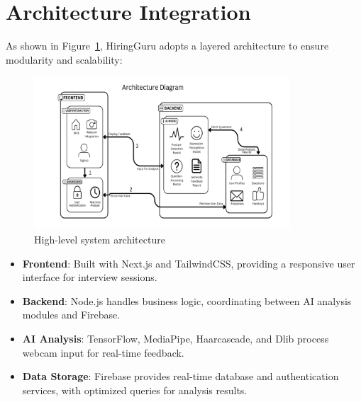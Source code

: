 \section{Architecture Integration}
As shown in Figure~\ref{fig:architecture}, HiringGuru adopts a layered architecture to ensure modularity and scalability:

\begin{figure}[h]
  \centering
  \includegraphics[width=0.85\textwidth]{sections/diagrams/ArchitectureDiagram.png}
  \caption{High-level system architecture}
  \label{fig:architecture}
\end{figure}

\begin{itemize}
    \item \textbf{Frontend}: Built with Next.js and TailwindCSS, providing a responsive user interface for interview sessions.
    \item \textbf{Backend}: Node.js handles business logic, coordinating between AI analysis modules and Firebase.
    \item \textbf{AI Analysis}: TensorFlow, MediaPipe, Haarcascade, and Dlib process webcam input for real-time feedback.
    \item \textbf{Data Storage}: Firebase provides real-time database and authentication services, with optimized queries for analysis results.
\end{itemize}

